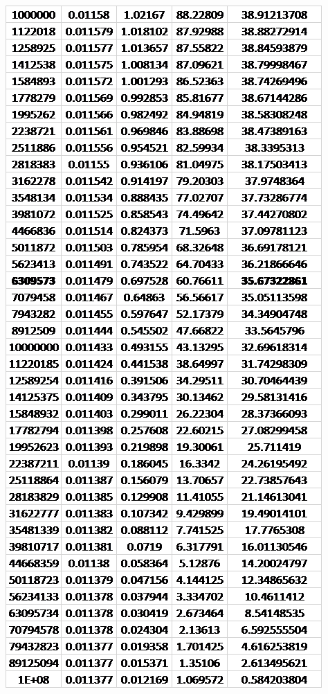 \documentclass{article}
\begin{document}
	\pagebreak
	\begin{table}[!ht]
		\centering
		\includegraphics[width=0.4\textheight]{data_cascode_gain_4.png}
	\end{table}
\end{document}

